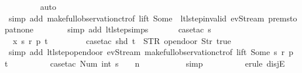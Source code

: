 \begin{isabellebody}
\ \ \ \ \ \ \ \isamarkupfalse%
\ auto{\isacharbrackleft}{}{\isacharbrackright}\isanewline
\ \ \ \ \ \ \isamarkupfalse%
\ {\isacharparenleft}simp\ add{\isacharcolon}\ make{\isacharunderscore}full{\isacharunderscore}observation{\isachardot}ctr{\isacharbrackleft}of\ lift\ {\isachardoublequoteopen}Some\ {}{\isachardoublequoteclose}{\isacharbrackright}\ ltl{\isacharunderscore}step{\isacharunderscore}{}{\isacharunderscore}invalid\ ev{\isacharunderscore}Stream\ prem{\isacharunderscore}stop{\isacharunderscore}at{\isacharunderscore}none{\isacharparenright}\isanewline
\ \ \ \ \ \ \isamarkupfalse%
\ {\isacharparenleft}simp\ add{\isacharcolon}\ ltl{\isacharunderscore}step{\isachardot}simps{\isacharparenright}\isanewline
\isanewline
\ \ \ \ \ \isamarkupfalse%
\ {\isacharparenleft}case{\isacharunderscore}tac\ {\isachardoublequoteopen}s\ {\isasymin}\ {\isacharbraceleft}{}{\isacharcomma}\ {}{\isacharcomma}\ {}{\isacharcomma}\ {}{\isacharbraceright}{\isachardoublequoteclose}{\isacharparenright}\isanewline
\ \ \ \ \ \isamarkupfalse%
\ \ x\ s\ r\ p\ t\isanewline
\ \ \ \ \ \ \ \isamarkupfalse%
\ {\isacharparenleft}case{\isacharunderscore}tac\ {\isachardoublequoteopen}shd\ t\ {\isacharequal}\ {\isacharparenleft}STR\ {\isacharprime}{\isacharprime}opendoor{\isacharprime}{\isacharprime}{\isacharcomma}\ {\isacharbrackleft}Str\ {\isacharprime}{\isacharprime}true{\isacharprime}{\isacharprime}{\isacharbrackright}{\isacharparenright}{\isachardoublequoteclose}{\isacharparenright}\isanewline
\ \ \ \ \ \ \ \ \isamarkupfalse%
\ {\isacharparenleft}simp\ add{\isacharcolon}\ ltl{\isacharunderscore}step{\isacharunderscore}opendoor\ ev{\isacharunderscore}Stream\ make{\isacharunderscore}full{\isacharunderscore}observation{\isachardot}ctr{\isacharbrackleft}of\ lift\ {\isachardoublequoteopen}Some\ s{\isachardoublequoteclose}\ r\ p\ t{\isacharbrackright}{\isacharparenright}\isanewline
\ \ \ \ \ \ \ \ \isamarkupfalse%
\ {\isacharparenleft}case{\isacharunderscore}tac\ {\isachardoublequoteopen}Num\ {\isacharparenleft}int\ {\isacharparenleft}s\ {\isacharminus}\ {}{\isacharparenright}{\isacharparenright}\ {\isacharequal}\ n{\isachardoublequoteclose}{\isacharparenright}\isanewline
\ \ \ \ \ \ \ \ \ \isamarkupfalse%
\ simp\isanewline
\ \ \ \ \ \ \ \ \isamarkupfalse%
\ {\isacharparenleft}erule\ disjE{\isacharparenright}\isanewline

\end{isabellebody}
